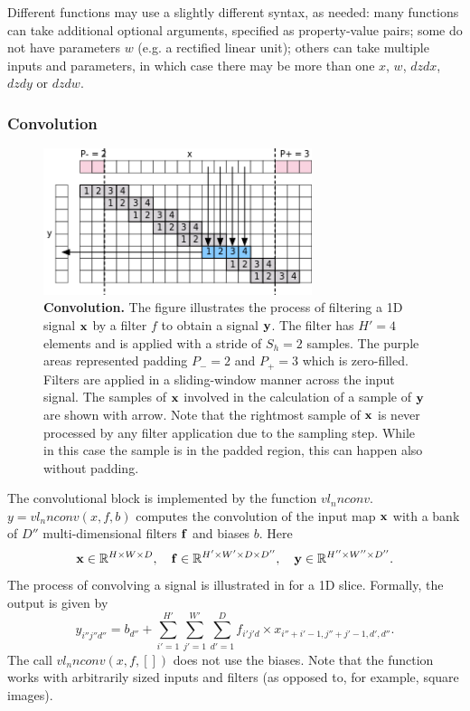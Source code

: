 Different functions may use a slightly different syntax, as needed: many functions can take additional optional arguments, specified as property-value pairs; some do not have parameters  $w$ (e.g. a rectified linear unit); others can take multiple inputs and parameters, in which case there may be more than one $x$, $w$, $dzdx$, $dzdy$ or $dzdw$.

\subsubsection{Convolution}\label{s:convolution}

\begin{figure}[H]
	\centering
	\includegraphics[width=0.7\textwidth]{figures/svg/conv}
	\caption{\textbf{Convolution.} The figure illustrates the process of filtering a 1D signal $\mathbf{x}$ by a filter $f$ to obtain a signal $\mathbf{y}$. The filter has $H'=4$ elements and is applied with a stride of $S_h =2$ samples. The purple areas represented padding $P_-=2$ and $P_+=3$ which is zero-filled. Filters are applied in a sliding-window manner across the input signal. The samples of $\mathbf{x}$ involved in the calculation of a sample of $\mathbf{y}$ are shown with arrow. Note that the rightmost sample of $\mathbf{x}$  is never processed by any filter application due to the sampling step. While in this case the sample is in the padded region, this can happen also without padding.}\label{f:conv}
\end{figure}

The convolutional block is implemented by the function $vl_nnconv$. $y=vl_nnconv(x,f,b)$ computes the convolution of the input map $\mathbf{x}$ with a bank of $D''$ multi-dimensional filters $\mathbf{f}$ and biases $b$. Here
\[
\mathbf{x}\in\mathbb{R}^{H \times W \times D}, \quad
\mathbf{f}\in\mathbb{R}^{H' \times W' \times D \times D''}, \quad
\mathbf{y}\in\mathbb{R}^{H'' \times W'' \times D''}.
\]
The process of convolving a signal is illustrated in  for a 1D slice. Formally, the output is given by
\[
y_{i''j''d''}
=
b_{d''}
+
\sum_{i'=1}^{H'}
\sum_{j'=1}^{W'}
\sum_{d'=1}^D
f_{i'j'd} \times x_{i''+i'-1,j''+j'-1,d',d''}.
\]
The call $vl_nnconv(x,f,[])$ does not use the biases. Note that the function works with arbitrarily sized inputs and filters (as opposed to, for example, square images). 

